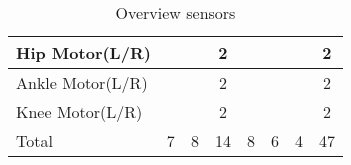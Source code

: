 \begin{table}[]
\begin{tabular}{|l|c|c|c|c|c|c|c|}
		Hip Motor(L/R)        &                          &                                       & 2                                   &                                      &                                    &                                          & 2                          \\ \hline
		Ankle Motor(L/R)      &                          &                                       & 2                                   &                                      &                                    &                                          & 2                          \\ \hline
		Knee Motor(L/R)       &                          &                                       & 2                                   &                                      &                                    &                                          & 2                          \\ \hline
		Total                 & 7                        & 8                                     & 14                                  & 8                                    & 6                                  & 4                                        & 47                         \\ \hline
	\end{tabular}
	\caption{Overview sensors}
	\label{my-label}
\end{table}





